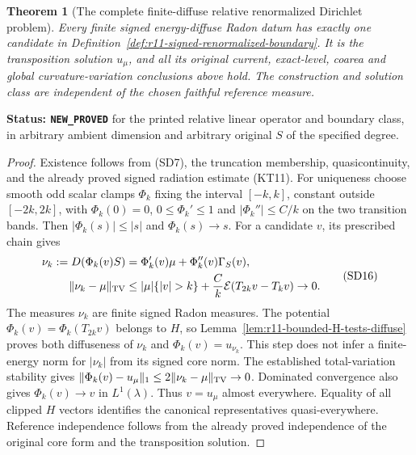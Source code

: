 \documentclass[11pt,a4paper]{article}
\numberwithin{equation}{section}
\newtheorem{theorem}{Theorem}[section]
\theoremstyle{definition}
\theoremstyle{remark}
\begin{document}
\begin{theorem}[The complete finite-diffuse relative renormalized Dirichlet problem]
\label{thm:r11-signed-renormalized-Dirichlet}
Every finite signed energy-diffuse Radon datum has exactly one
candidate in Definition~\ref{def:r11-signed-renormalized-boundary}.
It is the transposition solution $u_\mu$, and all its original
current, exact-level, coarea and global curvature-variation
conclusions above hold.  The construction and solution class
are independent of the chosen faithful reference measure.
\end{theorem}

\noindent\textbf{Status: \texttt{NEW\_PROVED}} for the
printed relative linear operator and boundary class, in
arbitrary ambient dimension and arbitrary original $S$ of
the specified degree.

\begin{proof}
Existence follows from (SD7), the truncation membership,
quasicontinuity, and the already proved signed radiation
estimate (KT11).  For uniqueness choose smooth odd scalar
clamps $\Phi_k$ fixing the interval $[-k,k]$, constant
outside $[-2k,2k]$, with $\Phi_k(0)=0$,
$0\le\Phi_k'\le1$ and
$|\Phi_k''|\le C/k$ on the two transition bands.
Then $|\Phi_k(s)|\le|s|$ and $\Phi_k(s)\to s$.
For a candidate $v$, its prescribed chain gives
\[
 \begin{split}
 \nu_k:=D(\Phi_k(v)S)
       &=\Phi_k'(v)\mu+\Phi_k''(v)\Gamma_S(v),\\
 \|\nu_k-\mu\|_{\rm TV}
       &\le |\mu|\{|v|>k\}
                +\frac Ck\mathcal E(T_{2k}v-T_kv)\to0.
 \end{split}
 \tag{SD16}
\]
The measures $\nu_k$ are finite signed Radon measures.
The potential $\Phi_k(v)=\Phi_k(T_{2k}v)$ belongs to $H$,
so Lemma~\ref{lem:r11-bounded-H-tests-diffuse} proves
both diffuseness of $\nu_k$ and
$\Phi_k(v)=u_{\nu_k}$.  This step does not infer a
finite-energy norm for $|\nu_k|$ from its signed core norm.
The established total-variation stability gives
$\|\Phi_k(v)-u_\mu\|_1\le2\|\nu_k-\mu\|_{\rm TV}\to0$.
Dominated convergence also gives $\Phi_k(v)\to v$ in
$L^1(\lambda)$.  Thus $v=u_\mu$ almost everywhere.
Equality of all clipped $H$ vectors identifies the canonical
representatives quasi-everywhere.  Reference independence
follows from the already proved independence of the original
core form and the transposition solution.
\end{proof}
\end{document}
